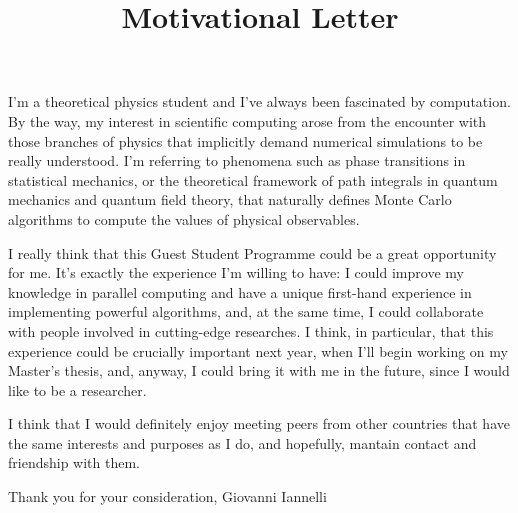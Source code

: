 \documentclass{article}
\title{Motivational Letter}
\date{}
\begin{document}
\maketitle

I'm a theoretical physics student and I've always been fascinated by computation. By the way, my interest in scientific computing arose from the encounter with those branches of physics that implicitly demand numerical simulations to be really understood. I'm referring to phenomena such as phase transitions in statistical mechanics, or the theoretical framework of path integrals in quantum mechanics and quantum field theory, that naturally defines Monte Carlo algorithms to compute the values of physical observables.

I really think that this Guest Student Programme could be a great opportunity for me. It's exactly the experience I'm willing to have: I could improve my knowledge in parallel computing and have a unique first-hand experience in implementing powerful algorithms, and, at the same time, I could collaborate with people involved in cutting-edge researches. I think, in particular, that this experience could be crucially important next year, when I'll begin working on my Master's thesis, and, anyway, I could bring it with me in the future, since I would like to be a researcher.

I think that I would definitely enjoy meeting peers from other countries that have the same interests and purposes as I do, and hopefully, mantain contact and friendship with them.

Thank you for your consideration,
Giovanni Iannelli
\end{document}
